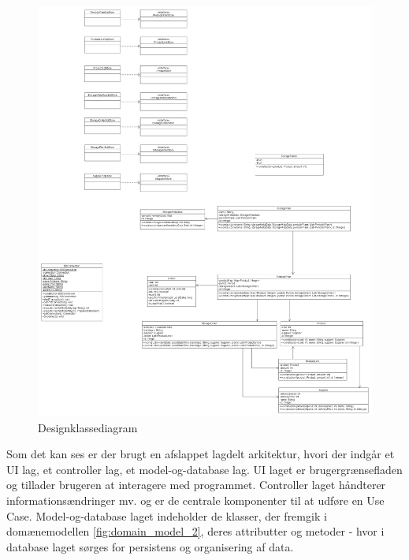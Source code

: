 \begin{landscape}
    \begin{figure}
        \centering
        \includegraphics[width=0.6\hsize]{figures/design/designclassdiagram.png}
        \caption{Designklassediagram}
        \label{fig:new_designclassdiagram}
    \end{figure}
\end{landscape}
Som det kan ses er der brugt en afslappet lagdelt arkitektur, hvori der indgår et UI lag, et controller lag, et model-og-database lag\cite{Larman2004}. UI laget er brugergrænsefladen og tillader brugeren at interagere med programmet. Controller laget håndterer informationsændringer mv. og er de centrale komponenter til at udføre en Use Case. Model-og-database laget indeholder de klasser, der fremgik i domænemodellen \ref{fig:domain_model_2}, deres attributter og metoder - hvor i database laget sørges for persistens og organisering af data.
